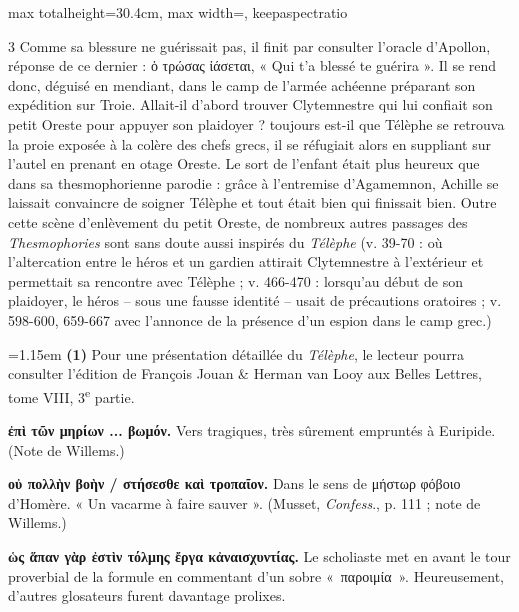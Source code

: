 \documentclass[11pt,twoside]{book}
\newcommand{\italique}[1]{\textit{#1}}
\newcommand{\nieme}[1]{#1\textsuperscript{e}}
\begin{document}
\begin{adjustbox}{max totalheight=30.4cm, max width=\textwidth, keepaspectratio}
\begin{minipage}{\textwidth}
{\begin{multicols}{3}
\noindent Comme sa blessure ne guérissait pas, il finit par consulter l'oracle d'Apollon, réponse de ce dernier : ὁ τρώσας ἰάσεται, « Qui t'a blessé te guérira ». Il se rend donc, déguisé en mendiant, dans le camp de l'armée achéenne préparant son expédition sur Troie. Allait-il d'abord trouver Clytemnestre qui lui confiait son petit Oreste pour appuyer son plaidoyer ? toujours est-il que Télèphe se retrouva la proie exposée à la colère des chefs grecs, il se réfugiait alors en suppliant sur l'autel en prenant en otage Oreste. Le sort de l'enfant était plus heureux que dans sa thesmophorienne parodie : grâce à l'entremise d'Agamemnon, Achille se laissait convaincre de soigner Télèphe et tout était bien qui finissait bien. Outre cette scène d'enlèvement du petit Oreste, de nombreux autres passages des \italique{Thesmophories} sont sans doute aussi inspirés du \italique{Télèphe} (v. 39-70 : où l'altercation entre le héros et un gardien attirait Clytemnestre à l'extérieur et permettait sa rencontre avec Télèphe ; v. 466-470 : lorsqu'au début de son plaidoyer, le héros -- sous une fausse identité -- usait de précautions oratoires ; v. 598-600, 659-667 avec l'annonce de la présence d'un espion dans le camp grec.)
\par\vspace{1.5pt}
\par\vspace{1.2pt}\par\nopagebreak\vspace{1pt}\noindent\hangindent=1.15em {\color{sepiaNote}\textbf{(1)}} Pour une présentation détaillée du \italique{Télèphe}, le lecteur pourra consulter l'édition de François Jouan \& Herman van Looy aux Belles Lettres, tome VIII, \nieme{3} partie.
\par\vspace{1.5pt}
 \textbf{ἐπὶ τῶν μηρίων ... βωμόν.} Vers tragiques, très sûrement empruntés à Euripide. (Note de Willems.)
\par\vspace{1.5pt}
 \textbf{οὐ πολλὴν βοὴν / στήσεσθε καὶ τροπαῖον.} Dans le sens de μήστωρ φόβοιο d'Homère. « Un vacarme à faire sauver ». (Musset, \italique{Confess}., p. 111 ; note de Willems.)
\par\vspace{1.5pt}
 \textbf{ὡς ἅπαν γὰρ ἐστὶν τόλμης ἔργα κἀναισχυντίας.} Le scholiaste met en avant le tour proverbial de la formule en commentant d'un sobre «~παροιμία~». Heureusement, d'autres glosateurs furent davantage prolixes.

\end{multicols}}
\end{minipage}
\end{adjustbox}
\end{document}
